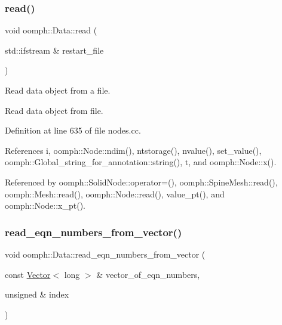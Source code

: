 \subsubsection{\texorpdfstring{read()}{read()}}
{\footnotesize\ttfamily void oomph\+::\+Data\+::read (\begin{DoxyParamCaption}\item[{std\+::ifstream \&}]{restart\+\_\+file }\end{DoxyParamCaption})}



Read data object from a file. 

Read data object from file. 

Definition at line 635 of file nodes.\+cc.



References i, oomph\+::\+Node\+::ndim(), ntstorage(), nvalue(), set\+\_\+value(), oomph\+::\+Global\+\_\+string\+\_\+for\+\_\+annotation\+::string(), t, and oomph\+::\+Node\+::x().



Referenced by oomph\+::\+Solid\+Node\+::operator=(), oomph\+::\+Spine\+Mesh\+::read(), oomph\+::\+Mesh\+::read(), oomph\+::\+Node\+::read(), value\+\_\+pt(), and oomph\+::\+Node\+::x\+\_\+pt().

\mbox{\label{classoomph_1_1Data_ae958e52df6ede2a08f957db4ee685ca7}} 
\subsubsection{\texorpdfstring{read\+\_\+eqn\+\_\+numbers\+\_\+from\+\_\+vector()}{read\_eqn\_numbers\_from\_vector()}}
{\footnotesize\ttfamily void oomph\+::\+Data\+::read\+\_\+eqn\+\_\+numbers\+\_\+from\+\_\+vector (\begin{DoxyParamCaption}\item[{const \hyperlink{classoomph_1_1Vector}{Vector}$<$ long $>$ \&}]{vector\+\_\+of\+\_\+eqn\+\_\+numbers,  }\item[{unsigned \&}]{index }\end{DoxyParamCaption})\hspace{0.3cm}{\ttfamily [virtual]}}



